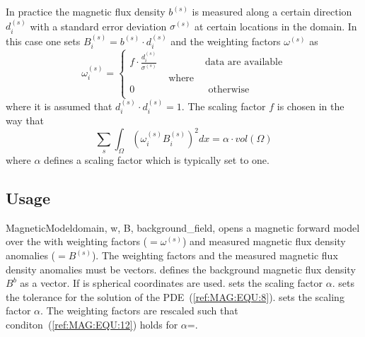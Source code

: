 In practice the magnetic flux density $b^{(s)}$ is measured along a certain
direction $d^{(s)}_i$ with a standard error deviation $\sigma^{(s)}$ at
certain locations in the domain.
In this case one sets $B^{(s)}_i=b^{(s)} \cdot d^{(s)}_i$ and the weighting
factors $\omega^{(s)}$ as
\begin{equation}\label{ref:MAG:EQU:11}
\omega^{(s)}_i 
= \left\{
\begin{array}{lcl}
f \cdot  \frac{d^{(s)}_i}{\sigma^{(s)}} & & \mbox{data are available} \\
& \mbox{ where } & \\
0 & & \mbox{ otherwise } \\
\end{array}
\right.
\end{equation} 
where it is assumed that $d^{(s)}_i \cdot d^{(s)}_i =1$.
The scaling factor $f$ is chosen in the way that 
\begin{equation}\label{ref:MAG:EQU:12}
\sum_{s} \int_{\Omega} ( \omega^{(s)}_i B^{(s)}_i ) ^2 dx =\alpha \cdot  vol(\Omega)
\end{equation} 
where $\alpha$ defines a scaling factor which is typically set to one.


\subsection{Usage}


\begin{classdesc}{MagneticModel}{domain, w, B, background_field,
        }
opens a magnetic forward model over the \Domain {} with 
weighting factors  ($=\omega^{(s)}$) and measured magnetic flux
density anomalies  ($=B^{(s)}$).
The weighting factors and the  measured magnetic flux density anomalies must be vectors.
 defines the background magnetic flux density $B^b$
as a vector.
If  is \True spherical coordinates are used. 
 sets the scaling factor $\alpha$. 
 sets the tolerance for the solution of the PDE~(\ref{ref:MAG:EQU:8}).
 sets the scaling factor $\alpha$.
The weighting factors are rescaled such that conditon~(\ref{ref:MAG:EQU:12}) holds for
$\alpha$=. 
\end{classdesc}


